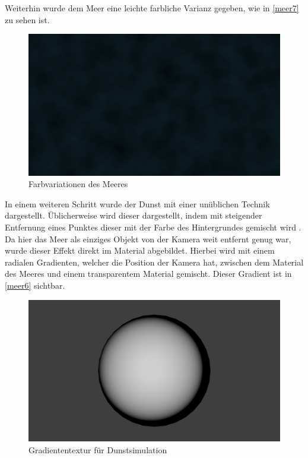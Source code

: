 Weiterhin wurde dem Meer eine leichte farbliche Varianz gegeben, wie in \autoref{meer7} zu sehen ist.

\begin{figure}[H]
\includegraphics[width=\textwidth]{gfx/prod/ocean/meer7.jpg}
\caption{Farbvariationen des Meeres}
\label{meer7}
\end{figure}

In einem weiteren Schritt wurde der Dunst mit einer unüblichen Technik dargestellt. Üblicherweise wird dieser dargestellt, indem mit steigender Entfernung eines Punktes dieser mit der Farbe des Hintergrundes gemischt wird \cite{mist}. Da hier das Meer als einziges Objekt von der Kamera weit entfernt genug war, wurde dieser Effekt direkt im Material abgebildet. Hierbei wird mit einem radialen Gradienten, welcher die Position der Kamera hat, zwischen dem Material des Meeres und einem transparentem Material gemischt. Dieser Gradient ist in \autoref{meer6} sichtbar.

\begin{figure}[H]
\includegraphics[width=\textwidth]{gfx/prod/ocean/meer6.jpg}
\caption{Gradiententextur für Dunstsimulation}
\label{meer6}
\end{figure}

